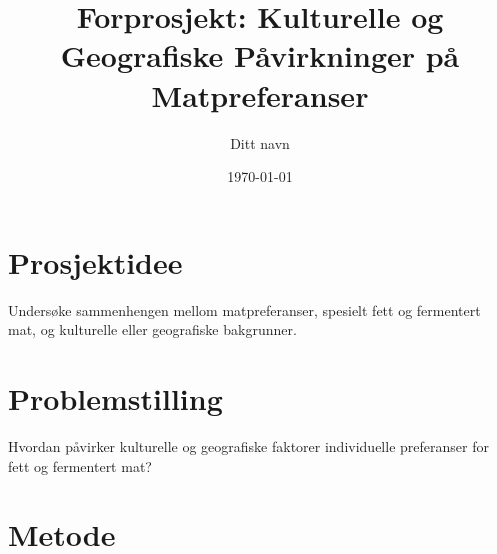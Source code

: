 \documentclass{article}
\begin{document}
\title{Forprosjekt: Kulturelle og Geografiske Påvirkninger på Matpreferanser}
\author{Ditt navn}
\date{\today}

\maketitle

\section*{Prosjektidee}

Undersøke sammenhengen mellom matpreferanser, spesielt fett og fermentert mat, og kulturelle eller geografiske bakgrunner.

\section*{Problemstilling}

Hvordan påvirker kulturelle og geografiske faktorer individuelle preferanser for fett og fermentert mat?

\section*{Metode}
\end{document}
